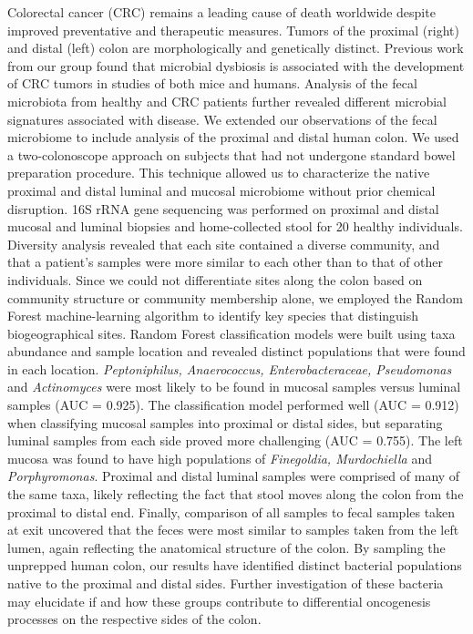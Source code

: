 \documentclass[11pt,]{article}
\begin{document}
Colorectal cancer (CRC) remains a leading cause of death worldwide
despite improved preventative and therapeutic measures. Tumors of the
proximal (right) and distal (left) colon are morphologically and
genetically distinct. Previous work from our group found that microbial
dysbiosis is associated with the development of CRC tumors in studies of
both mice and humans. Analysis of the fecal microbiota from healthy and
CRC patients further revealed different microbial signatures associated
with disease. We extended our observations of the fecal microbiome to
include analysis of the proximal and distal human colon. We used a
two-colonoscope approach on subjects that had not undergone standard
bowel preparation procedure. This technique allowed us to characterize
the native proximal and distal luminal and mucosal microbiome without
prior chemical disruption. 16S rRNA gene sequencing was performed on
proximal and distal mucosal and luminal biopsies and home-collected
stool for 20 healthy individuals. Diversity analysis revealed that each
site contained a diverse community, and that a patient's samples were
more similar to each other than to that of other individuals. Since we
could not differentiate sites along the colon based on community
structure or community membership alone, we employed the Random Forest
machine-learning algorithm to identify key species that distinguish
biogeographical sites. Random Forest classification models were built
using taxa abundance and sample location and revealed distinct
populations that were found in each location. \emph{Peptoniphilus,
Anaerococcus, Enterobacteraceae, Pseudomonas} and \emph{Actinomyces}
were most likely to be found in mucosal samples versus luminal samples
(AUC = 0.925). The classification model performed well (AUC = 0.912)
when classifying mucosal samples into proximal or distal sides, but
separating luminal samples from each side proved more challenging (AUC =
0.755). The left mucosa was found to have high populations of
\emph{Finegoldia, Murdochiella} and \emph{Porphyromonas}. Proximal and
distal luminal samples were comprised of many of the same taxa, likely
reflecting the fact that stool moves along the colon from the proximal
to distal end. Finally, comparison of all samples to fecal samples taken
at exit uncovered that the feces were most similar to samples taken from
the left lumen, again reflecting the anatomical structure of the colon.
By sampling the unprepped human colon, our results have identified
distinct bacterial populations native to the proximal and distal sides.
Further investigation of these bacteria may elucidate if and how these
groups contribute to differential oncogenesis processes on the
respective sides of the colon.
\end{document}
